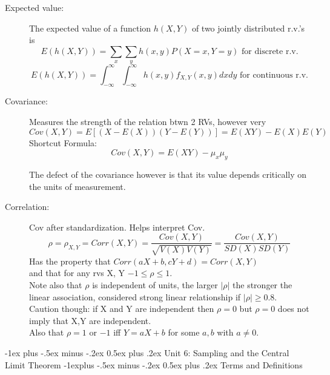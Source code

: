 \documentclass[10pt,landscape]{article}
\makeatletter
\renewcommand{\section}{\@startsection{section}{1}{0mm}%
                                {-1ex plus -.5ex minus -.2ex}%
                                {0.5ex plus .2ex}%
                                {\normalfont\large\bfseries}}
\renewcommand{\subsection}{\@startsection{subsection}{2}{0mm}%
                                {-1explus -.5ex minus -.2ex}%
                                {0.5ex plus .2ex}%
                                {\normalfont\normalsize\bfseries}}
\makeatother
\begin{document}
\begin{multicols}{3}
\begin{description}
\item[Expected value:] The expected value of a function $h(X, Y)$ of two jointly distributed r.v.'s is  
\[E(h(X, Y)) = \sum_x\sum_yh(x, y)P(X=x, Y=y) \text{ for discrete r.v.}\] 
\[E(h(X, Y)) = \int_{-\infty}^{\infty}\int_{-\infty}^{\infty}h(x, y)f_{X,Y}(x, y)dxdy \text{ for continuous r.v.}\]

\item[Covariance:] Measures the strength of the relation btwn 2 RVs, however very 
$$ Cov(X,Y) = E[(X-E(X))(Y - E(Y))] = E(XY) - E(X)E(Y) $$
Shortcut Formula:
$$	Cov(X,Y) = E(XY)  -  \mu_{x} \mu_{y}$$

The defect of the covariance however is that its value depends critically on the units of measurement.

\item[Correlation:] Cov after standardization. Helps interpret Cov. 
$$ \rho =  \rho_{X,Y} = Corr(X,Y) = \frac{Cov(X,Y)}{\sqrt{V(X)V(Y)}} = \frac{Cov(X,Y)}{SD(X) SD(Y)} $$
Has the property that $Corr(aX+b, cY+d) = Corr(X,Y)$\\
and that for any rvs X, Y $-1 \leq \rho \leq 1$.\\

Note also that $\rho$  is independent of units, the larger $|\rho|$ the stronger the linear association, considered strong linear relationship if $|\rho| \geq 0.8$.\\

Caution though: if X and Y are independent then $\rho = 0$ but $\rho =0$ does not imply that X,Y are independent.\\
Also that $\rho = 1$ or $-1$ iff $Y = aX+b$ for some $a,b$ with $a\neq0$.
\end{description}


\section{Unit 6: Sampling and the Central Limit Theorem}
	\subsection{Terms and Definitions}
\begin{description}


\end{description}
\end{multicols}
\end{document}
